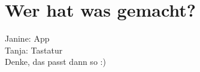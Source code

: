 \documentclass[11pt]{article}
\begin{document}
	
\section{Wer hat was gemacht?}
	Janine: App\\
	Tanja: Tastatur\\
	Denke, das passt dann so :)

	
	
\end{document}
